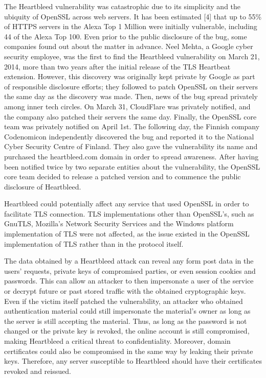 \documentclass[12pt,a4paper,english,onecolumn]{IEEEtran}
\begin{document}
The Heartbleed vulnerability was catastrophic due to its simplicity and the ubiquity of OpenSSL across web servers. It has been estimated [4]  that up to 55\% of HTTPS servers in the Alexa Top 1 Million were initially vulnerable, including 44 of the Alexa Top 100. Even prior to the public disclosure of the bug, some companies found out about the matter in advance. Neel Mehta, a Google cyber security employee, was the first to find the Heartbleed vulnerability on March 21, 2014, more than two years after the initial release of the TLS Heartbeat extension. However, this discovery was originally kept private by Google as part of responsible disclosure efforts; they followed to patch OpenSSL on their servers the same day as the discovery was made. Then, news of the bug spread privately among inner tech circles. On March 31, CloudFlare was privately notified, and the company also patched their servers the same day. Finally, the OpenSSL core team was privately notified on April 1st. The following day, the Finnish company Codenomicon independently discovered the bug and reported it to the National Cyber Security Centre of Finland. They also gave the vulnerability its name and purchased the heartbleed.com domain in order to spread awareness. After having been notified twice by two separate entities about the vulnerability, the OpenSSL core team decided to release a patched version and to commence the public disclosure of Heartbleed. \par
	Heartbleed could potentially affect any service that used OpenSSL in order to facilitate TLS connection. TLS implementations other than OpenSSL’s, such as GnuTLS, Mozilla’s Network Security Services and the Windows platform implementation of TLS were not affected, as the issue existed in the OpenSSL implementation of TLS rather than in the protocol itself. \par
The data obtained by a Heartbleed attack can reveal any form post data in the users' requests, private keys of compromised parties, or even session cookies and passwords. This can allow an attacker to then impersonate a user of the service or decrypt future or past stored traffic with the obtained cryptographic keys. Even if the victim itself patched the vulnerability, an attacker who obtained authentication material could still impersonate the material’s owner as long as the server is still accepting the material. Thus, as long as the password is not changed or the private key is revoked, the online account is still compromised, making Heartbleed a critical threat to confidentiality. Moreover, domain certificates could also be compromised in the same way by leaking their private keys. Therefore, any server susceptible to Heartbleed should have their certificates revoked and reissued. \par
\end{document}
